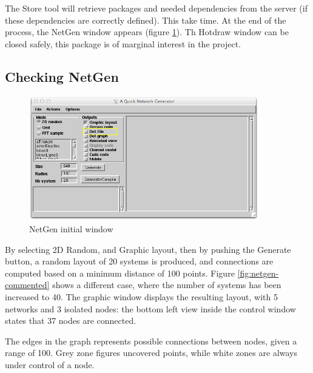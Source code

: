 \documentclass[times,a4paper]{book}
\begin{document}
The Store tool will retrieve packages and needed dependencies from the server (if these dependencies
are correctly defined). This take time. At the end of the process, the NetGen window appears (figure  \ref{fig:netgen-initial}).
Th Hotdraw window can be closed safely, this package is of marginal interest in the project.


\subsection {Checking NetGen }
\begin{figure}[hbtp]
\begin{center} 
\includegraphics[width=10cm]{netgen-initial.png}
\caption{NetGen initial window }
\label{fig:netgen-initial}
\end{center}
\end{figure}

By selecting 2D Random, and Graphic layout, then by pushing the Generate button,  a random layout
of 20 systems is produced, and connections are computed based on a minimum distance of 100 points.
Figure \ref{fig:netgen-commented} shows a different case, where the number of systems has been
increased to 40. The graphic window displays the resulting layout, with 5 networks and 3 isolated nodes:
the bottom left view inside the control window states that 37 nodes are connected. 

The edges in the graph represents possible connections between nodes, given a range of 100. Grey zone figures
uncovered points, while white zones are always under control of a node.
\end{document}
